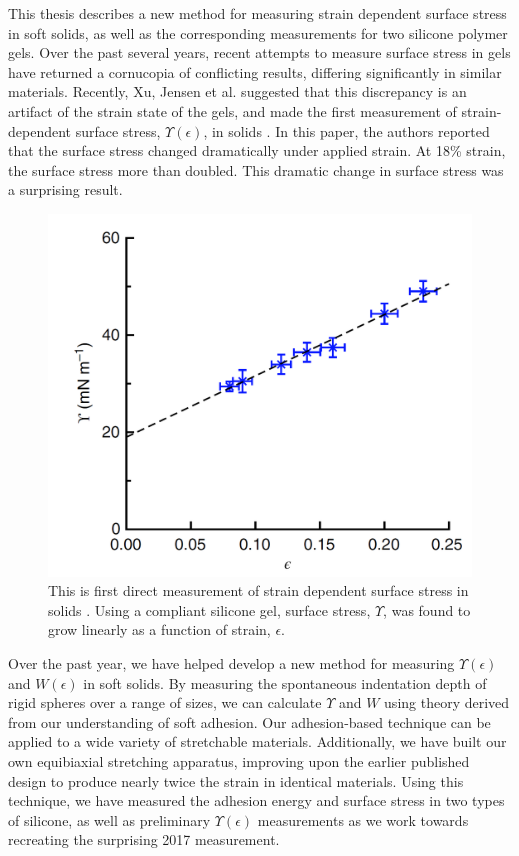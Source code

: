 This thesis describes a new method for measuring strain dependent surface stress in soft solids, as well as the corresponding measurements for two silicone polymer gels. Over the past several years, recent attempts to measure surface stress in gels have returned a cornucopia of conflicting results, differing significantly in similar materials. Recently, Xu, Jensen et al. suggested that this discrepancy is an artifact of the strain state of the gels, and made the first measurement of strain-dependent surface stress, $\Upsilon(\epsilon)$, in solids \cite{xu2017direct}. In this paper, the authors reported that the surface stress changed dramatically under applied strain. At 18\% strain, the surface stress more than doubled. This dramatic change in surface stress was a surprising result. 
\begin{figure}[h!]
	\centering
	\includegraphics[width=0.69\linewidth]{Chapters/Figures/2017natcomfig}
	\caption[Surface Stress vs. Strain in Silicone]{This is first direct measurement of strain dependent surface stress in solids \cite{xu2017direct}. Using a compliant silicone gel, surface stress, $\Upsilon$, was found to grow linearly as a function of strain, $ \epsilon $.}
	\label{fig:2017natcomfig}
\end{figure}

Over the past year, we have helped develop a new method for measuring $\Upsilon(\epsilon)$ and $ W(\epsilon) $ in soft solids. By measuring the spontaneous indentation depth of rigid spheres over a range of sizes, we can calculate $ \Upsilon $ and $ W $ using theory derived from our understanding of soft adhesion. Our adhesion-based technique can be applied to a wide variety of stretchable materials. Additionally, we have built our own equibiaxial stretching apparatus, improving upon the earlier published design \cite{xu2017direct} to produce nearly twice the strain in identical materials. Using this technique, we have measured the adhesion energy and surface stress in two types of silicone, as well as preliminary $ \Upsilon(\epsilon) $ measurements as we work towards recreating the surprising 2017 measurement.


